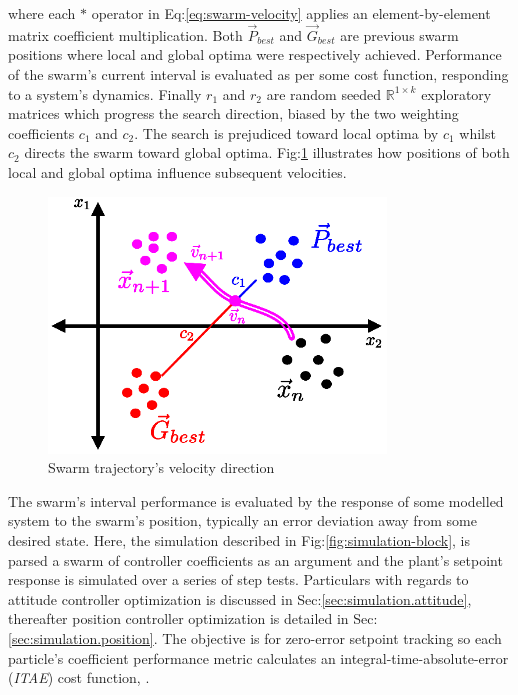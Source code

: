 where each $\ast$ operator in Eq:\ref{eq:swarm-velocity} applies an element-by-element matrix coefficient multiplication. Both $\vec{P}_{best}$ and $\vec{G}_{best}$ are previous swarm positions where local and global optima were respectively achieved. Performance of the swarm's current interval is evaluated as per some cost function, responding to a system's dynamics. Finally $r_1$ and $r_2$ are random seeded $\mathbb{R}^{1\times k}$ exploratory matrices which progress the search direction, biased by the two weighting coefficients $c_1$ and $c_2$. The search is prejudiced toward local optima by $c_1$ whilst $c_2$ directs the swarm toward global optima. Fig:\ref{fig:swarm-trajectory} illustrates how positions of both local and global optima influence subsequent velocities.
\begin{figure}[hbtp]
\centering
\includegraphics[width=0.8\textwidth]{figs/swarm-trajectory}
\vspace{-10pt}
\caption{Swarm trajectory's velocity direction}
\label{fig:swarm-trajectory}
\vspace{-8pt}
\end{figure}
\par
The swarm's interval performance is evaluated by the response of some modelled system to the swarm's position, typically an error deviation away from some desired state. Here, the simulation described in Fig:\ref{fig:simulation-block}, is parsed a swarm of controller coefficients as an argument and the plant's setpoint response is simulated over a series of step tests. Particulars with regards to attitude controller optimization is discussed in Sec:\ref{sec:simulation.attitude}, thereafter position controller optimization is detailed in Sec:\ref{sec:simulation.position}. The objective is for zero-error setpoint tracking so each particle's coefficient performance metric calculates an integral-time-absolute-error (\emph{ITAE}) cost function, \cite{ITAE}.
